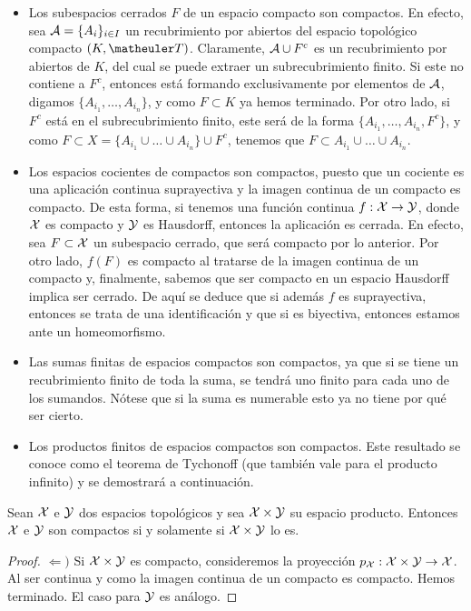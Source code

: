 \begin{itemize}
\begin{itemize}
\item Los subespacios cerrados $F$ de un espacio compacto son compactos. En efecto, sea $\mathcal{A}=\{A_i\}_{i\in I}$ un recubrimiento por abiertos del espacio topológico compacto $(K, \T)$. Claramente, $\mathcal{A}\cup F^c$ es un recubrimiento por abiertos de $K$, del cual se puede extraer un subrecubrimiento finito. Si este no contiene a $F^c$, entonces está formando exclusivamente por elementos de $\mathcal{A}$, digamos $\{A_{i_1},\ldots, A_{i_n}\}$, y como $F\subset K$ ya hemos terminado. Por otro lado, si $F^c$ está en el subrecubrimiento finito, este será de la forma $\{A_{i_1},\ldots, A_{i_n},F^c\}$, y como $F\subset X=\{A_{i_1}\cup \ldots\cup  A_{i_n}\}\cup F^c$, tenemos que $F\subset A_{i_1}\cup \ldots\cup  A_{i_n}$.
\item Los espacios cocientes de compactos son compactos, puesto que un cociente es una aplicación continua suprayectiva y la imagen continua de un compacto es compacto. De esta forma, si tenemos una función continua $f: \mathcal{X}\to \mathcal{Y}$, donde $\mathcal{X}$ es compacto y $\mathcal{Y}$ es Hausdorff, entonces la aplicación es cerrada. En efecto, sea $F\subset \mathcal{X}$ un subespacio cerrado, que será compacto por lo anterior. Por otro lado, $f(F)$ es compacto al tratarse de la imagen continua de un compacto y, finalmente, sabemos que ser compacto en un espacio Hausdorff implica ser cerrado. De aquí se deduce que si además $f$ es suprayectiva, entonces se trata de una identificación y que si es biyectiva, entonces estamos ante un homeomorfismo. 
\item Las sumas finitas de espacios compactos son compactos, ya que si se tiene un recubrimiento finito de toda la suma, se tendrá uno finito para cada uno de los sumandos. Nótese que si la suma es numerable esto ya no tiene por qué ser cierto. 
\item Los productos finitos de espacios compactos son compactos. Este resultado se conoce como el teorema de Tychonoff (que también vale para el producto infinito) y se demostrará a continuación. 
\end{itemize}

\begin{theo} Sean $\mathcal{X}$ e $\mathcal{Y}$ dos espacios topológicos y sea $\mathcal{X} \times \mathcal{Y}$ su espacio producto. Entonces $\mathcal{X}$ e $\mathcal{Y}$ son compactos si y solamente si $\mathcal{X}\times \mathcal{Y}$ lo es.
\begin{proof}

$\Leftarrow )$ Si $\mathcal{X}\times \mathcal{Y}$ es compacto, consideremos la proyección $p_{\mathcal{X}}: \mathcal{X}\times \mathcal{Y} \to \mathcal{X}$. Al ser continua y como la imagen continua de un compacto es compacto. Hemos terminado. El caso para $\mathcal{Y}$ es análogo. 


\end{proof}
\end{theo}
\end{itemize}

